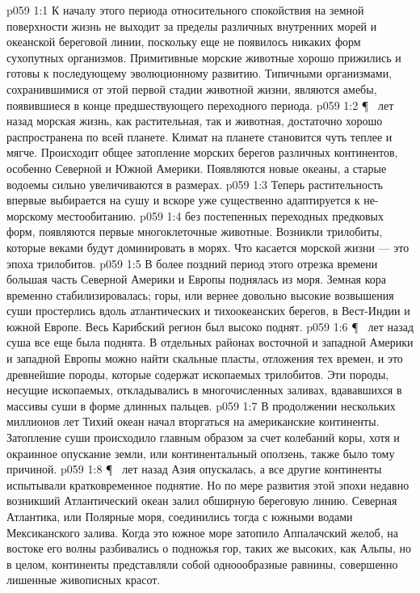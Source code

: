 \vs p059 1:1 К началу этого периода относительного спокойствия на земной поверхности жизнь не выходит за пределы различных внутренних морей и океанской береговой линии, поскольку еще не появилось никаких форм сухопутных организмов. Примитивные морские животные хорошо прижились и готовы к последующему эволюционному развитию. Типичными организмами, сохранившимися от этой первой стадии животной жизни, являются амебы, появившиеся в конце предшествующего переходного периода.
\vs p059 1:2 \P\  лет назад морская жизнь, как растительная, так и животная, достаточно хорошо распространена по всей планете. Климат на планете становится чуть теплее и мягче. Происходит общее затопление морских берегов различных континентов, особенно Северной и Южной Америки. Появляются новые океаны, а старые водоемы сильно увеличиваются в размерах.
\vs p059 1:3 Теперь растительность впервые выбирается на сушу и вскоре уже существенно адаптируется к не\hyp{}морскому местообитанию.
\vs p059 1:4  без постепенных переходных предковых форм, появляются первые многоклеточные животные. Возникли трилобиты, которые веками будут доминировать в морях. Что касается морской жизни --- это эпоха трилобитов.
\vs p059 1:5 В более поздний период этого отрезка времени большая часть Северной Америки и Европы поднялась из моря. Земная кора временно стабилизировалась; горы, или вернее довольно высокие возвышения суши простерлись вдоль атлантических и тихоокеанских берегов, в Вест\hyp{}Индии и южной Европе. Весь Карибский регион был высоко поднят.
\vs p059 1:6 \P\  лет назад суша все еще была поднята. В отдельных районах восточной и западной Америки и западной Европы можно найти скальные пласты, отложения тех времен, и это древнейшие породы, которые содержат ископаемых трилобитов. Эти породы, несущие ископаемых, откладывались в многочисленных заливах, вдававшихся в массивы суши в форме длинных пальцев.
\vs p059 1:7 В продолжении нескольких миллионов лет Тихий океан начал вторгаться на американские континенты. Затопление суши происходило главным образом за счет колебаний коры, хотя и окраинное опускание земли, или континентальный оползень, также было тому причиной.
\vs p059 1:8 \P\  лет назад Азия опускалась, а все другие континенты испытывали кратковременное поднятие. Но по мере развития этой эпохи недавно возникший Атлантический океан залил обширную береговую линию. Северная Атлантика, или Полярные моря, соединились тогда с южными водами Мексиканского залива. Когда это южное море затопило Аппалачский желоб, на востоке его волны разбивались о подножья гор, таких же высоких, как Альпы, но в целом, континенты представляли собой одноообразные равнины, совершенно лишенные живописных красот.
